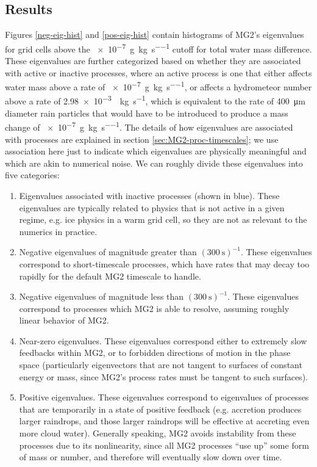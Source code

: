 \documentclass [11pt, proquest] {uwthesis}[2020/02/24]
\begin{document}
\subsection{Results}

\label{sec:timescales-results}

Figures \ref{neg-eig-hist} and \ref{pos-eig-hist} contain histograms of MG2's eigenvalues for grid cells above the \SI{e-7}{\gram\per\kilo\gram\per\second} cutoff for total water mass difference. These eigenvalues are further categorized based on whether they are associated with active or inactive processes, where an active process is one that either affects water mass above a rate of \SI{e-7}{\gram\per\kilo\gram\per\second}, or affects a hydrometeor number above a rate of \SI{2.98e-3}{\per\kilo\gram\per\second}, which is equivalent to the rate of \SI{400}{\micro\meter} diameter rain particles that would have to be introduced to produce a mass change of \SI{e-7}{\gram\per\kilo\gram\per\second}. The details of how eigenvalues are associated with processes are explained in section \ref{sec:MG2-proc-timescales}; we use association here just to indicate which eigenvalues are physically meaningful and which are akin to numerical noise. We can roughly divide these eigenvalues into five categories:

\begin{enumerate}
\item Eigenvalues associated with inactive processes (shown in blue). These eigenvalues are typically related to physics that is not active in a given regime, e.g. ice physics in a warm grid cell, so they are not as relevant to the numerics in practice.
\item Negative eigenvalues of magnitude greater than $(\SI{300}{\second})^{-1}$. These eigenvalues correspond to short-timescale processes, which have rates that may decay too rapidly for the default MG2 timescale to handle.
\item Negative eigenvalues of magnitude less than $(\SI{300}{\second})^{-1}$. These eigenvalues correspond to processes which MG2 is able to resolve, assuming roughly linear behavior of MG2.
\item Near-zero eigenvalues. These eigenvalues correspond either to extremely slow feedbacks within MG2, or to forbidden directions of motion in the phase space (particularly eigenvectors that are not tangent to surfaces of constant energy or mass, since MG2's process rates must be tangent to such surfaces).
\item Positive eigenvalues. These eigenvalues correspond to eigenvalues of processes that are temporarily in a state of positive feedback (e.g. accretion produces larger raindrops, and those larger raindrops will be effective at accreting even more cloud water). Generally speaking, MG2 avoids instability from these processes due to its nonlinearity, since all MG2 processes ``use up'' some form of mass or number, and therefore will eventually slow down over time.
\end{enumerate}
\end{document}
